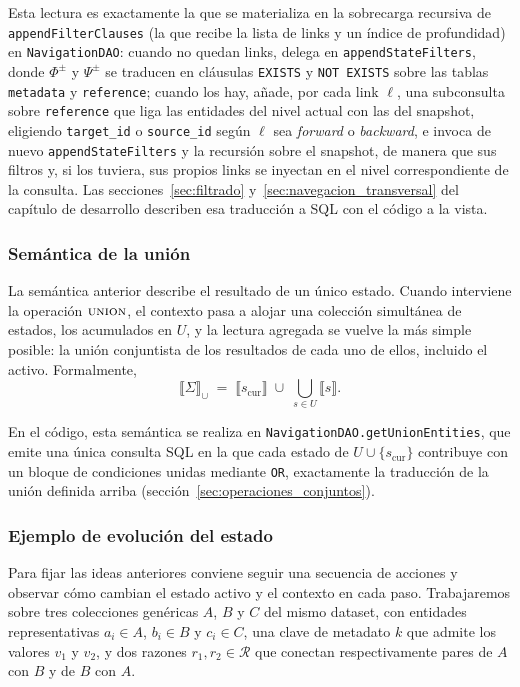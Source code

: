 Esta lectura es exactamente la que se materializa en la sobrecarga recursiva de \texttt{appendFilterClauses}
(la que recibe la lista de links y un índice de profundidad) en \texttt{NavigationDAO}: cuando no quedan
links, delega en \texttt{appendStateFilters}, donde $\Phi^{\pm}$ y $\Psi^{\pm}$ se traducen en cláusulas
\texttt{EXISTS} y \texttt{NOT EXISTS} sobre las tablas \texttt{metadata} y \texttt{reference}; cuando los
hay, añade, por cada link $\ell$, una subconsulta sobre \texttt{reference} que liga las entidades del nivel
actual con las del snapshot, eligiendo \texttt{target\_id} o \texttt{source\_id} según $\ell$ sea
\textit{forward} o \textit{backward}, e invoca de nuevo \texttt{appendStateFilters} y la recursión sobre el
snapshot, de manera que sus filtros y, si los tuviera, sus propios links se inyectan en el nivel
correspondiente de la consulta. Las secciones~\ref{sec:filtrado} y~\ref{sec:navegacion_transversal} del
capítulo de desarrollo describen esa traducción a SQL con el código a la vista.

\subsubsection*{Semántica de la unión}

La semántica anterior describe el resultado de un único estado. Cuando interviene la operación
$\textsc{union}$, el contexto pasa a alojar una colección simultánea de estados, los acumulados en $U$, y la
lectura agregada se vuelve la más simple posible: la unión conjuntista de los resultados de cada uno de
ellos, incluido el activo. Formalmente,
\[
  \llbracket \Sigma \rrbracket_{\cup} \;=\; \llbracket s_{\text{cur}} \rrbracket \;\cup\; \bigcup_{s \in U} \llbracket s \rrbracket.
\]

En el código, esta semántica se realiza en \texttt{NavigationDAO.getUnionEntities}, que emite una única
consulta SQL en la que cada estado de $U \cup \{s_{\text{cur}}\}$ contribuye con un bloque de condiciones
unidas mediante \texttt{OR}, exactamente la traducción de la unión definida arriba
(sección~\ref{sec:operaciones_conjuntos}).

\subsubsection*{Ejemplo de evolución del estado}

Para fijar las ideas anteriores conviene seguir una secuencia de acciones y observar cómo cambian el estado
activo y el contexto en cada paso. Trabajaremos sobre tres
colecciones genéricas $A$, $B$ y $C$ del mismo dataset, con entidades representativas $a_{i} \in A$,
$b_{i} \in B$ y $c_{i} \in C$, una clave de metadato $k$ que admite los valores $v_{1}$ y $v_{2}$, y dos
razones $r_{1}, r_{2} \in \mathcal{R}$ que conectan respectivamente pares de $A$ con $B$ y de $B$ con $A$.

